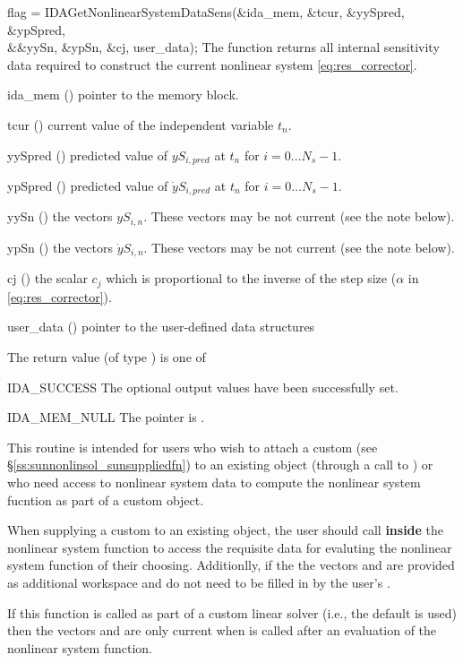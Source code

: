 {
  flag = IDAGetNonlinearSystemDataSens(&ida\_mem, \&tcur, \&yySpred, \&ypSpred,\\
                                       &\&yySn, \&ypSn, \&cj, user\_data);
}
{
  The function  returns all internal
  sensitivity data required to construct the current nonlinear system
  \eqref{eq:res_corrector}.
}
{
  \begin{args}
  \item[ida\_mem] () pointer to the {\idas} memory block.
  \item[tcur] () current value of the independent variable $t_n$.
  \item[yySpred] () predicted value of $yS_{i,pred}$ at $t_n$
    for $i = 0 \dots N_s - 1$.
  \item[ypSpred] () predicted value of $\dot{y}S_{i,pred}$ at
    $t_n$ for $i = 0 \dots N_s - 1$.
  \item[yySn] () the vectors $yS_{i,n}$. These vectors may be
    not current (see the note below).
  \item[ypSn] () the vectors $\dot{y}S_{i,n}$. These vectors may
    be not current (see the note below).
  \item[cj] () the scalar $c_j$ which is proportional to the
  inverse of the step size ($\alpha$ in \eqref{eq:res_corrector}).
  \item[user\_data] () pointer to the user-defined data structures
  \end{args}
}
{
  The return value  (of type ) is one of
  \begin{args}
  \item[IDA\_SUCCESS]
    The optional output values have been successfully set.
  \item[IDA\_MEM\_NULL]
    The  pointer is .
  \end{args}
}
{
  This routine is intended for users who wish to attach a custom
   (see \S\ref{ss:sunnonlinsol_sunsuppliedfn}) to an
  existing  object (through a call to
  ) or who need access to nonlinear system data to
  compute the nonlinear system fucntion as part of a custom
   object.

  When supplying a custom  to an existing
   object, the user should call
   \textbf{inside} the nonlinear system
  function to access the requisite data for evaluting the nonlinear system
  function of their choosing. Additionlly, if the the vectors  and
   are provided as additional workspace and do not need to be filled in
  by the user's .

  If this function is called as part of a custom linear solver (i.e., the
  default  is used) then the vectors  and
   are only current when  is
  called after an evaluation of the nonlinear system function.
}

